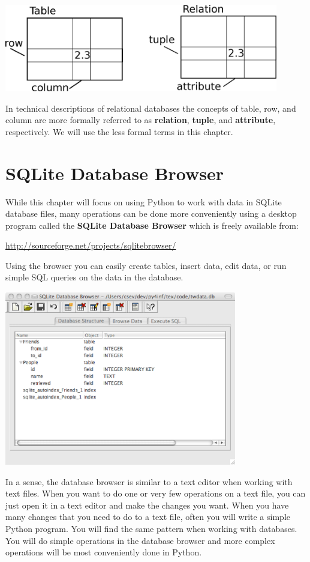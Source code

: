 \documentclass[10pt]{book}
\begin{document}
\beforefig
\centerline{\includegraphics[height=1.50in]{figs2/relational.eps}}
\afterfig

In technical descriptions of relational databases the concepts of 
table, row, and column are more formally referred
to as {\bf relation}, {\bf tuple}, and {\bf attribute}, respectively.
We will use the less formal terms in this chapter.

\section{SQLite Database Browser}

While this chapter will focus on using Python to work with data 
in SQLite database files, many operations can be done more
conveniently using a desktop program called the {\bf SQLite
Database Browser} which is freely available from:

\url{http://sourceforge.net/projects/sqlitebrowser/}

Using the browser you can easily create tables, insert data, edit data, 
or run simple SQL queries on the data in the database.

\beforefig
\centerline{\includegraphics[height=3.00in]{figs2/sqlite.eps}}
\afterfig

In a sense, the database browser is similar to a text editor
when working with text files.   When you want to do one or
very few operations on a text file, you can just open it
in a text editor and make the changes you want.   When you have 
many changes that you need to do to a text file, often you 
will write a simple Python program.  You will find the same 
pattern when working with databases.  You will do simple
operations in the database browser and more complex operations
will be most conveniently done in Python.
\end{document}
